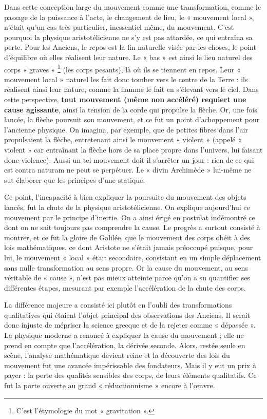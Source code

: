 \documentclass[a4paper,12pt]{article}
\begin{document}
Dans cette conception large du mouvement comme une transformation, comme le passage de la puissance à l’acte, le changement de lieu, le « mouvement local », n'était qu'un cas très particulier, inessentiel même, du mouvement. C'est pourquoi la physique aristotélicienne ne s'y est pas attardée, ce qui entraîna sa perte. Pour les Anciens, le repos est la fin naturelle visée par les choses, le point d'équilibre où elles réalisent leur nature. Le « bas » est ainsi le lieu naturel des corps « graves » \footnote{C’est l’étymologie du mot « gravitation ».} (les corps pesants), là où ils se tiennent en repos. Leur « mouvement local » naturel les fait donc tomber vers le centre de la Terre : ils réalisent ainsi leur nature, comme la flamme le fait en s’élevant vers le ciel. Dans cette perspective,  \textbf{tout mouvement (même non accéléré) requiert une cause agissante}, ainsi la tension de la corde qui propulse la flèche. Or, une fois lancée, la flèche poursuit son mouvement, et ce fut un point d'achoppement pour l'ancienne physique. On imagina, par exemple, que de petites fibres dans l'air propulsaient la flèche, entretenant ainsi le mouvement « violent » (appelé « violent » car entraînant la flèche hors de sa place propre dans l'univers, lui faisant donc violence). Aussi un tel mouvement doit-il s'arrêter un jour : rien de ce qui est contra naturam ne peut se perpétuer. Le « divin Archimède » lui-même ne sut élaborer que les principes d’une statique. 

Ce point, l'incapacité à bien expliquer la poursuite du mouvement des objets lancés, fut la chute de la physique aristotélicienne. On explique aujourd'hui ce mouvement par le principe d'inertie. On a ainsi érigé en postulat indémontré ce dont on ne sait toujours pas comprendre la cause. Le progrès a surtout consisté à montrer, et ce fut la gloire de Galilée, que le mouvement des corps obéit à des lois mathématiques, ce dont Aristote ne s'était jamais préoccupé puisque, pour lui, le mouvement « local » était secondaire, consistant en un simple déplacement sans nulle transformation au sens propre. Or la cause du mouvement, au sens véritable de « cause », n’est pas mieux atteinte parce qu'on a su quantifier ses différentes étapes, mesurant par exemple l'accélération de la chute des corps. 

La différence majeure a consisté ici plutôt en l'oubli des transformations qualitatives qui étaient l'objet principal des observations des Anciens. Il serait donc injuste de mépriser la science grecque et de la rejeter comme « dépassée ». La physique moderne a renoncé à expliquer la cause du mouvement ; elle ne prend en compte que l'accélération, la dérivée seconde. Alors, restée seule en scène, l'analyse mathématique devient reine et la découverte des lois du mouvement fut une avancée impérissable des fondateurs. Mais il y eut un prix à payer : la perte des qualités sensibles des corps, de leurs éléments qualitatifs. Ce fut la porte ouverte au grand « réductionnisme » encore à l'œuvre.
\end{document}
